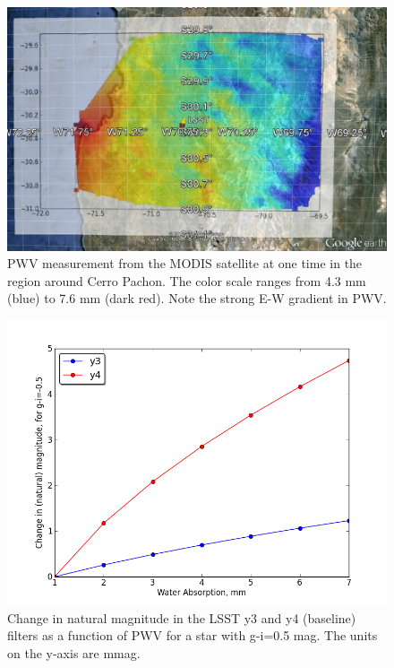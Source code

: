 \documentclass[12pt,preprint]{aastex}
\begin{document}
\begin{figure}[htbp]
\includegraphics[width=6in]{AtmoFigs/PWV_satellite_2}
\caption{ {PWV measurement from the MODIS satellite at one time in the region
around Cerro Pachon.   The color scale ranges from 4.3 mm (blue) to 7.6 mm (dark red). Note the strong E-W gradient in PWV.}
\label{fig:PWV_satellite} }
\end{figure}

\begin{figure}[htbp]
\includegraphics[width=6in]{AtmoFigs/wv_3}
\caption{ {Change in natural magnitude in the LSST y3 and y4 (baseline) filters
as a function of PWV for a star with g-i=0.5 mag. The units on the
y-axis are mmag.}
\label{fig:wv_3} }
\end{figure}
\end{document}
